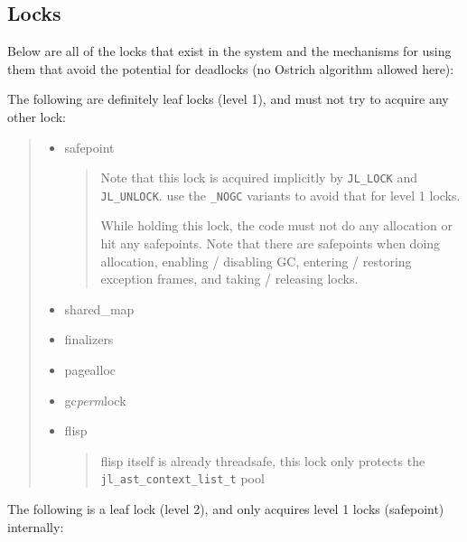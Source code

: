 \hypertarget{13071695811965191352}{}


\subsection{Locks}



Below are all of the locks that exist in the system and the mechanisms for using them that avoid the potential for deadlocks (no Ostrich algorithm allowed here):



The following are definitely leaf locks (level 1), and must not try to acquire any other lock:



\begin{quote}
\begin{itemize}
\item safepoint

\begin{quote}
Note that this lock is acquired implicitly by \texttt{JL\_LOCK} and \texttt{JL\_UNLOCK}. use the \texttt{\_NOGC} variants to avoid that for level 1 locks.

While holding this lock, the code must not do any allocation or hit any safepoints. Note that there are safepoints when doing allocation, enabling / disabling GC, entering / restoring exception frames, and taking / releasing locks.

\end{quote}

\item shared\_map


\item finalizers


\item pagealloc


\item gc\emph{perm}lock


\item flisp

\begin{quote}
flisp itself is already threadsafe, this lock only protects the \texttt{jl\_ast\_context\_list\_t} pool

\end{quote}
\end{itemize}
\end{quote}


The following is a leaf lock (level 2), and only acquires level 1 locks (safepoint) internally:



